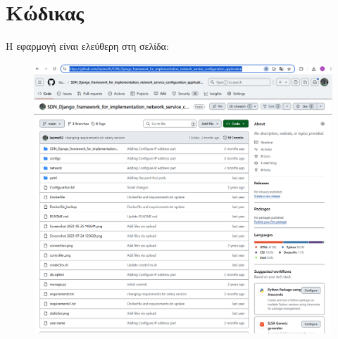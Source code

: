 \section{Κώδικας}

H εφαρμογή είναι ελεύθερη στη σελίδα:


\FloatBarrier

\begin{figure}[h]
	\centering
	\includegraphics[width=1.1\textwidth]{graphics/github_page.png}
	\caption{}
\end{figure}

\FloatBarrier


